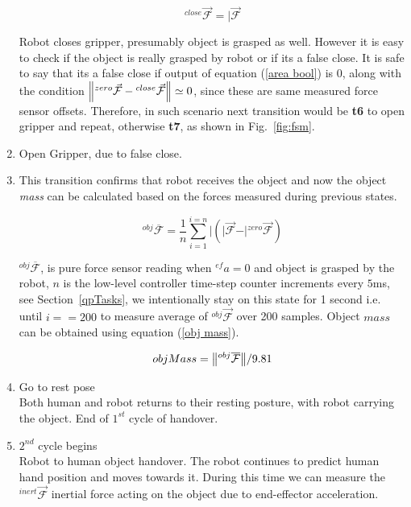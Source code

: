 \documentclass[a4paper, 12pt, oneside]{Thesis}  %
\begin{document}
\begin{enumerate}[start=0,label={\bf{t}\arabic*:}]
        \begin{equation}\label{Fclose}
        {}^{close}\vec{\mathcal{F}} = \vert{\vec{\mathcal{F}}}
        \end{equation}
    
    Robot closes gripper, presumably object is grasped as well. However it is easy to check if the object is really grasped by robot or if its a false close. It is safe to say that its a false close if output of equation (\ref{area bool}) is $0$, along with the condition $\norm{{}^{zero}\vec{\mathcal{F}}-{}^{close}\vec{\mathcal{F}}} \simeq{0}$, since these are same measured force sensor offsets. Therefore, in such scenario next transition would be \textbf{t6} to open gripper and repeat, otherwise \textbf{t7}, as shown in Fig.~\ref{fig:fsm}.
    
    \item Open Gripper, due to false close.
    
    \item This transition confirms that robot receives the object and now the object \textit{mass} can be calculated based on the forces measured during previous states.
    
    \begin{equation}
        {}^{obj}\overline{\mathcal{F}} = \frac{1}{n}\sum_{i=1}^{i=n} \vert{ (\vert{\vec{\mathcal{F}}} - \vert{{}^{zero}\vec{\mathcal{F}}}) }
    \end{equation}
    
    ${}^{obj}\overline{\mathcal{F}}$, is pure force sensor reading when ${}^{ef}a=0$ and object is grasped by the robot, $n$ is the low-level controller time-step counter increments every $5$ms, see Section~\ref{qpTasks}, we intentionally stay on this state for 1 second i.e. until $i==200$ to measure average of ${}^{obj}\vec{\mathcal{F}}$ over 200 samples. Object $mass$ can be obtained using equation (\ref{obj mass}).
    
    \begin{equation}\label{obj mass}
        objMass = \norm{{}^{obj}\overline{\mathcal{F}}}/9.81
    \end{equation}

    \item Go to rest pose \\
    Both human and robot returns to their resting posture, with robot carrying the object. End of $1^{st}$ cycle of handover.
    
    \item $2^{nd}$ cycle begins\\
    Robot to human object handover. The robot continues to predict human hand position and moves towards it. During this time we can measure the ${}^{inert}\vec{\mathcal{F}}$ inertial force acting on the object due to end-effector acceleration.


\end{enumerate}
\end{document}
